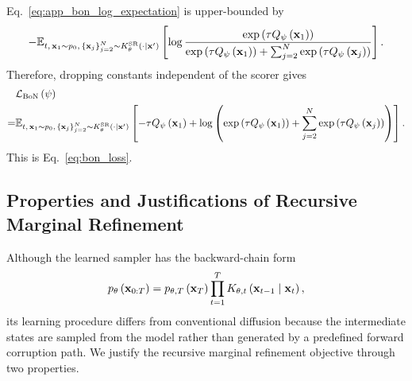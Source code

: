 Eq.~\eqref{eq:app_bon_log_expectation} is upper-bounded by
\begin{equation*}
\begin{aligned}
    -
    \mathbb{E}_{t,\,\mathbf{x}_1\sim p_0,\,\left\{\mathbf{x}_j\right\}_{j=2}^{N}\sim K_{\theta}^{\mathrm{SR}}\left(\cdot\mid\mathbf{x}'\right)}\left[
    \log
    \frac{
        \exp\left(\tau Q_\psi\left(\mathbf{x}_1\right)\right)
    }{
        \exp\left(\tau Q_\psi\left(\mathbf{x}_1\right)\right)
        +
        \sum_{j=2}^{N}
        \exp\left(\tau Q_\psi\left(\mathbf{x}_j\right)\right)
    }\right].
\end{aligned}
\end{equation*}
Therefore, dropping constants independent of the scorer gives
\begin{equation*}
\begin{aligned}
  &\mathcal{L}_{\mathrm{BoN}}\left(\psi\right)\\
  =&
  \mathbb{E}_{t,\,\mathbf{x}_1\sim p_0,\,\left\{\mathbf{x}_j\right\}_{j=2}^{N}\sim K_{\theta}^{\mathrm{SR}}\left(\cdot\mid \mathbf{x}'\right)}
  \left[
    -\tau Q_\psi\left(\mathbf{x}_1\right)
    +
    \log
    \left(
        \exp\left(\tau Q_\psi\left(\mathbf{x}_1\right)\right)
        +
        \sum_{j=2}^{N}
        \exp\left(\tau Q_\psi\left(\mathbf{x}_j\right)\right)
    \right)
  \right].
\end{aligned}
\end{equation*}
This is Eq.~\eqref{eq:bon_loss}.

\subsection{Properties and Justifications of Recursive Marginal Refinement}
\label{app:refinement_justification}

Although the learned sampler has the backward-chain form
\begin{equation*}
    p_\theta\left(\mathbf{x}_{0:T}\right)
    =
    p_{\theta,T}\left(\mathbf{x}_T\right)
    \prod_{t=1}^{T}
    K_{\theta,t}\left(\mathbf{x}_{t-1}\mid\mathbf{x}_t\right),
\end{equation*}
its learning procedure differs from conventional diffusion because the intermediate states are sampled from the model rather than generated by a predefined forward corruption path. 
We justify the recursive marginal refinement objective through two properties.


